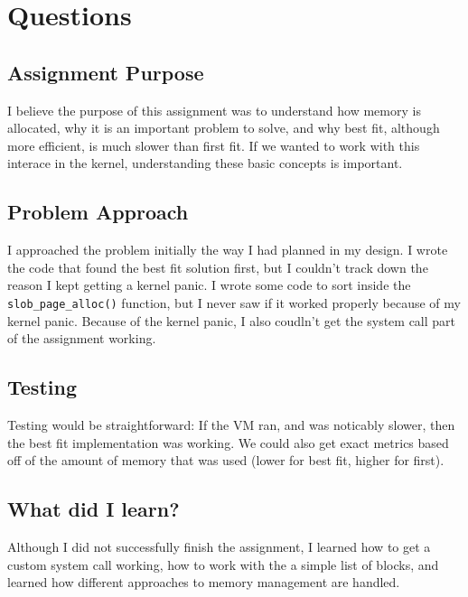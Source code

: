 \documentclass[10pt,letterpaper,onecolumn,draftclsnofoot]{IEEEtran}
\begin{document}
\section{Questions}
	\subsection{Assignment Purpose}
	I believe the purpose of this assignment was to understand how memory is allocated,
	why it is an important problem to solve, and why best fit, although more efficient,
	is much slower than first fit. If we wanted to work with this interace in the kernel,
	understanding these basic concepts is important.

	\subsection{Problem Approach}
	I approached the problem initially the way I had planned in my design. I 
	wrote the code that found the best fit solution first, but I couldn't track down
	the reason I kept getting a kernel panic. I wrote some code to sort inside the
	\texttt{slob\_page\_alloc()} function, but I never saw if it worked properly
	because of my kernel panic. Because of the kernel panic, I also coudln't get the
	system call part of the assignment working.

	\subsection{Testing}
	Testing would be straightforward: If the VM ran, and was noticably slower, then
	the best fit implementation was working. We could also get exact metrics based
	off of the amount of memory that was used (lower for best fit, higher for first).

	\subsection{What did I learn?}
	Although I did not successfully finish the assignment, I learned how to get a custom
	system call working, how to work with the a simple list of blocks, and learned how
	different approaches to memory management are handled.
\end{document}
